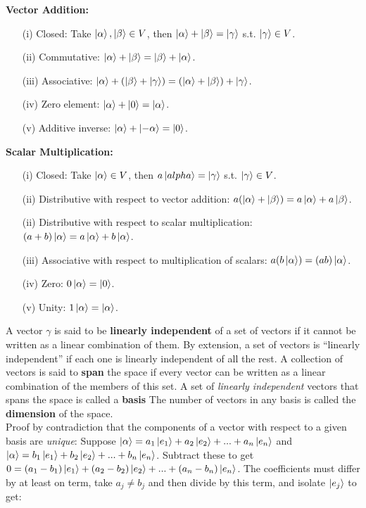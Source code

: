 \documentclass{article}
\begin{document}
\noindent \textbf{Vector Addition:}
\begin{itemize}
    \item[(i)] Closed: Take $\ket{\alpha},\ket{\beta} \in V$, then $\ket{\alpha} + \ket{\beta} = \ket{\gamma}$ s.t. $\ket{\gamma} \in V$.
    \item[(ii)] Commutative: $\ket{\alpha} + \ket{\beta} = \ket{\beta} + \ket{\alpha}$.
    \item[(iii)] Associative: $\ket{\alpha} + (\ket{\beta} + \ket{\gamma}) = (\ket{\alpha} + \ket{\beta}) + \ket{\gamma}$.
    \item[(iv)] Zero element: $\ket{\alpha} + \ket{0} = \ket{\alpha}$.
    \item[(v)] Additive inverse: $\ket{\alpha} + \ket{-\alpha} = \ket{0}$.
\end{itemize}

\noindent \textbf{Scalar Multiplication:}
\begin{itemize}
    \item[(i)] Closed: Take $\ket{\alpha} \in V$, then $a\ket{alpha} = \ket{\gamma}$ s.t. $\ket{\gamma} \in V$.
    \item[(ii)] Distributive with respect to vector addition: $a(\ket{\alpha} + \ket{\beta}) = a\ket{\alpha} + a\ket{\beta}$.
    \item[(ii)] Distributive with respect to scalar multiplication: $(a + b)\ket{\alpha} = a\ket{\alpha} + b\ket{\alpha}$.
    \item[(iii)] Associative with respect to multiplication of scalars: $a(b\ket{\alpha}) = (ab)\ket{\alpha}$.
    \item[(iv)] Zero: $0\ket{\alpha} = \ket{0}$.
    \item[(v)] Unity: $1 \ket{\alpha} = \ket{\alpha}$.
\end{itemize}

A vector $\gamma$ is said to be \textbf{linearly independent} of a set of vectors if it cannot be written as a linear combination of them. By extension, a set of vectors is ``linearly independent'' if each one is linearly independent of all the rest. A collection of vectors is said to \textbf{span} the space if every vector can be written as a linear combination of the members of this set. A set of \textit{linearly independent} vectors that spans the space is called a \textbf{basis} The number of vectors in any basis is called the \textbf{dimension} of the space. 
\\

Proof by contradiction that the components of a vector with respect to a given basis are \textit{unique}: Suppose $\ket{\alpha} = a_{1}\ket{e_{1}} + a_{2}\ket{e_{2}} + ... + a_{n}\ket{e_{n}}$ and $\ket{\alpha} = b_{1}\ket{e_{1}} + b_{2}\ket{e_{2}} + ... + b_{n}\ket{e_{n}}$. Subtract these to get $0 = (a_{1} - b_{1})\ket{e_{1}} + (a_{2} - b_{2})\ket{e_{2}} + ... + (a_{n} - b_{n})\ket{e_{n}}$. The coefficients must differ by at least on term, take $a_{j} \neq b_{j}$ and then divide by this term, and isolate $\ket{e_{j}}$ to get:
\end{document}
